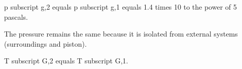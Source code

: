 p subscript g,2 equals p subscript g,1 equals 1.4 times 10 to the power of 5 pascals.  

The pressure remains the same because it is isolated from external systems (surroundings and piston).  

T subscript G,2 equals T subscript G,1.